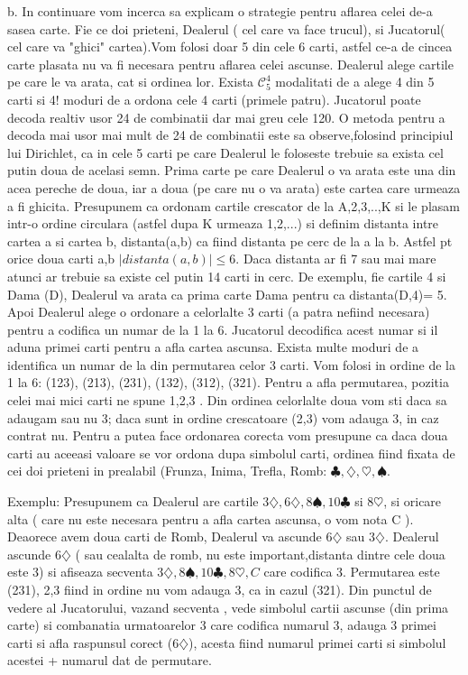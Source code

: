 \documentclass[11pt,leqno]{article}
\begin{document}
b. In continuare vom incerca sa explicam o strategie pentru aflarea celei de-a sasea carte. Fie ce doi prieteni, 
Dealerul ( cel care va face trucul), si Jucatorul( cel care va "ghici" cartea).Vom folosi doar 5 din cele 6 carti, astfel ce-a de cincea carte 
plasata nu va fi necesara pentru aflarea celei ascunse. Dealerul alege cartile pe care le va arata, cat si ordinea lor. Exista $\mathcal C_5^4$ 
modalitati de a alege 4 din 5 carti si 4! moduri de a ordona cele 4 carti (primele patru). Jucatorul poate decoda realtiv usor 24 de combinatii 
dar mai greu cele 120. O metoda pentru a decoda mai usor mai mult de 24 de combinatii este sa observe,folosind principiul lui Dirichlet, ca in cele 
5 carti pe care Dealerul le foloseste trebuie sa exista cel putin doua de acelasi semn. Prima carte pe care Dealerul o va arata este una din acea 
pereche de doua, iar a doua (pe care nu o va arata) este cartea care urmeaza a fi ghicita. Presupunem ca ordonam cartile crescator de la A,2,3,..,K si 
le plasam intr-o ordine circulara (astfel dupa K urmeaza 1,2,...) si definim distanta intre cartea a si cartea b, distanta(a,b) ca fiind distanta pe 
cerc de la a la b. Astfel pt orice doua carti a,b $|distanta(a,b)|\leq 6$. Daca distanta ar fi 7 sau mai mare atunci ar trebuie sa existe cel putin 14
 carti in cerc. De exemplu, fie cartile 4 si Dama (D), Dealerul va arata ca prima carte Dama pentru ca distanta(D,4)= 5. Apoi Dealerul alege o ordonare
  a celorlalte 3 carti (a patra nefiind necesara) pentru a codifica un numar de la 1 la 6. Jucatorul decodifica acest numar si il aduna primei carti 
  pentru a afla cartea ascunsa. Exista multe moduri de a identifica un numar de la din permutarea celor 3 carti. Vom folosi in ordine de la 1 la 6: (123), (213), (231), (132), (312), (321). 
  Pentru a afla permutarea, pozitia celei mai mici carti ne spune 1,2,3 . Din ordinea celorlalte doua vom sti daca sa adaugam sau nu 3; 
  daca sunt in ordine crescatoare (2,3) vom adauga 3, in caz contrat nu. Pentru a putea face ordonarea corecta vom presupune ca daca doua 
  carti au aceeasi valoare se vor ordona dupa simbolul carti, ordinea fiind fixata de cei doi prieteni in prealabil (Frunza, Inima, Trefla, Romb: $ \clubsuit, \diamondsuit, \heartsuit,\spadesuit$.

Exemplu: Presupunem ca Dealerul are cartile $3 \diamondsuit , 6 \diamondsuit,8 \spadesuit,10 \clubsuit$ si $8 \heartsuit$, si oricare alta ( care nu este necesara pentru a afla cartea ascunsa, o vom nota C ). 
Deaorece avem doua carti de Romb, Dealerul va ascunde $ 6 \diamondsuit$ sau $3 \diamondsuit$. 
Dealerul ascunde $6 \diamondsuit$ ( sau cealalta de romb, nu este important,distanta dintre cele doua este 3) si afiseaza secventa $ 3 \diamondsuit,8 \spadesuit,10 \clubsuit,8 \heartsuit, C$ care codifica 3. 
Permutarea este (231), 2,3 fiind in ordine nu vom adauga 3, ca in cazul (321). Din punctul de vedere al Jucatorului, vazand secventa , 
vede simbolul cartii ascunse (din prima carte) si combanatia urmatoarelor 3 care codifica numarul 3, adauga 3 primei carti si afla raspunsul corect ($6 \diamondsuit$), 
acesta fiind numarul primei carti si simbolul acestei + numarul dat de permutare.
\end{document}
